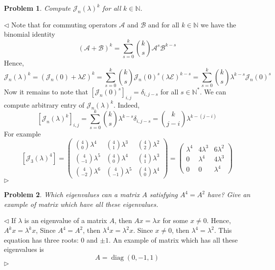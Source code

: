 \documentclass[12pt]{article}
\newtheorem{problem}{Problem}[subsection]
\newenvironment{solution}{\par $\triangleleft$}{$\triangleright$}
\begin{document}
\begin{problem} Compute ${\mathcal{J}_n(\lambda)}^k$ for all $k\in\mathbb{N}$.
\end{problem}
\begin{solution} Note that for commuting operators $\mathcal{A}$ and
    $\mathcal{B}$ and for all $k\in\mathbb{N}$ we have the binomial identity
    $$
        {(\mathcal{A}+\mathcal{B})}^k
        =\sum_{s=0}^k \binom{k}{s}\mathcal{A}^s\mathcal{B}^{k-s}
    $$
    Hence,
    $$
        {\mathcal{J}_n(\lambda)}^k
        ={(\mathcal{J}_n(0)+\lambda\mathcal{E})}^k
        =\sum_{s=0}^k
        \binom{k}{s}{\mathcal{J}_n(0)}^s{(\lambda\mathcal{E})}^{k-s}
        =\sum_{s=0}^k\binom{k}{s}\lambda^{k-s}{\mathcal{J}_n(0)}^s
    $$
    Now it remains to note that ${[{\mathcal{J}_n(0)}^s]}_{i,j}=\delta_{i,j-s}$
    for all $s\in\mathbb{N}^*$. We can compute arbitrary entry of
    ${\mathcal{J}_n(\lambda)}^k$. Indeed,
    $$
        {[ {\mathcal{J}_n(\lambda)}^k]}_{i,j}
        =\sum_{s=0}^k\binom{k}{s}\lambda^{k-s}\delta_{i,j-s}
        =\binom{k}{j-i}\lambda^{k-(j-i)}
    $$
    For example
    $$
        [ {\mathcal{J}_3(\lambda)}^4]=
        \begin{pmatrix}
            \binom{4}{0}\lambda^4  &
            \binom{4}{1}\lambda^3  &
            \binom{4}{2}\lambda^2    \\
            \binom{4}{-1}\lambda^5 &
            \binom{4}{0}\lambda^4  &
            \binom{4}{1}\lambda^3    \\
            \binom{4}{-2}\lambda^6 &
            \binom{4}{-1}\lambda^5 &
            \binom{4}{0}\lambda^4
        \end{pmatrix}
        =
        \begin{pmatrix}
            \lambda^4 & 4\lambda^3 & 6\lambda^2 \\
            0         & \lambda^4  & 4\lambda^3 \\
            0         & 0          & \lambda^4
        \end{pmatrix}
    $$
\end{solution}

\begin{problem} Which eigenvalues can a matrix $A$ satisfying $A^4=A^2$ have?
Give an example of matrix which have all these eigenvalues.
\end{problem}
\begin{solution} If $\lambda$ is an eigenvalue of a matrix $A$, then $Ax=\lambda
        x$ for some $x\neq 0$. Hence, $A^k x=\lambda^k x$, Since $A^4=A^2$, then
    $\lambda^4x=\lambda^2 x$. Since $x\neq 0$, then $\lambda^4=\lambda^2$.
    This equation has three roots: $0$ and $\pm 1$. An example of matrix
    which has all these eigenvalues is
    $$
        A=\operatorname{diag}(0,-1,1)
    $$
\end{solution}
\end{document}
